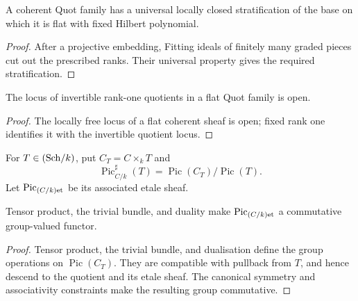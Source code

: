 \begin{lemma}
  \label{pa-lem-flattening-stratification}
  \cite{nitsure-hilbert-quot}
  A coherent Quot family has a universal locally closed stratification of the
  base on which it is flat with fixed Hilbert polynomial.
\end{lemma}

\begin{proof}
  After a projective embedding, Fitting ideals of finitely many graded pieces
  cut out the prescribed ranks.  Their universal property gives the required
  stratification.
\end{proof}

\begin{lemma}
  \label{pa-lem-invertible-open}
  \cite{kleiman-picard}
  The locus of invertible rank-one quotients in a flat Quot family is open.
\end{lemma}

\begin{proof}
  The locally free locus of a flat coherent sheaf is open; fixed rank one
  identifies it with the invertible quotient locus.
\end{proof}

\begin{definition}
  \label{pa-def-picard}
  \cite[Def.~2.2]{kleiman-picard}
  For \(T\in(\mathrm{Sch}/k)\), put \(C_T=C\times_kT\) and
  \[
    \operatorname{Pic}^{\sharp}_{C/k}(T)=
    \operatorname{Pic}(C_T)/\operatorname{Pic}(T).
  \]
  Let \(\operatorname{Pic}_{(C/k)\mathrm{et}}\) be its associated etale sheaf.
\end{definition}

\begin{proposition}
  \label{pa-prop-picard-group}
  \cite{kleiman-picard}
  Tensor product, the trivial bundle, and duality make
  \(\operatorname{Pic}_{(C/k)\mathrm{et}}\) a commutative group-valued functor.
\end{proposition}

\begin{proof}
  Tensor product, the trivial bundle, and dualisation define the group
  operations on \(\operatorname{Pic}(C_T)\).  They are compatible with
  pullback from \(T\), and hence descend to the quotient and its etale
  sheaf.  The canonical symmetry and associativity constraints make the
  resulting group commutative.
\end{proof}

